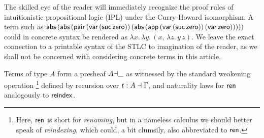 \documentclass[a4paper,USenglish,cleveref, autoref]{lipics-v2019}
\begin{document}
The skilled eye of the reader will immediately recognize the proof
rules of intuitionistic propositional logic (IPL) under the
Curry-Howard isomorphism.  A term such as
\(
  \mathsf{abs}\,(\mathsf{abs}\,(\mathsf{pair}\,
    (\mathsf{var}\,(\mathsf{suc}\,\mathsf{zero}))\,
    (\mathsf{abs}\,(\mathsf{app}\,(\mathsf{var}\,(\mathsf{suc}\,\mathsf{zero}))\,(\mathsf{var}\,\mathsf{zero})))))
\)
could in concrete syntax be rendered as
\(
  \lambda x.\,\lambda y.\,(x,\,\lambda z.\,y\,z)
  .
\)
We leave the exact connection to a printable
syntax of the STLC to imagination of the reader,
as we shall not be concerned with considering
concrete terms in this article.

Terms of type $A$ form a presheaf
$A{\dashv}\_$ as witnessed by the standard weakening operation%
\footnote{Here, $\mathsf{ren}$ is short for \emph{renaming}, but in a nameless
calculus we should better speak of \emph{reindexing}, which could, a
bit clumsily, also abbreviated to $\mathsf{ren}$.}
defined by recursion over $t : A \dashv \Gamma$,
and naturality laws for $\mathsf{ren}$ analogously to $\mathsf{reindex}$.
\end{document}
